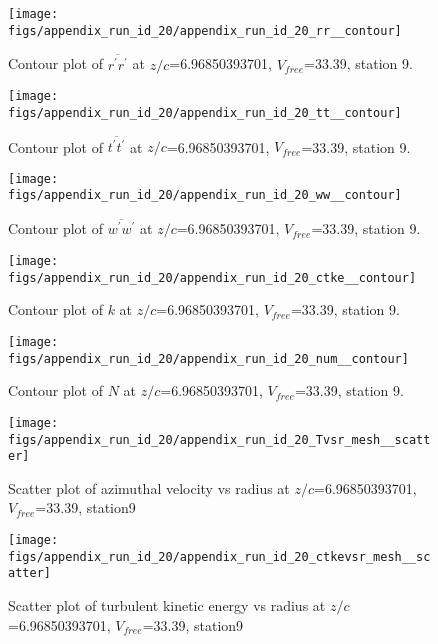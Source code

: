 \begin{figure}[H]
\centering
\texttt{[image: figs/appendix\_run\_id\_20/appendix\_run\_id\_20\_rr\_\_contour]}
\caption{Contour plot of $\overline{r^\prime r^\prime}$ at $z/c$=6.96850393701, $V_{free}$=33.39, station 9.}
\label{fig:appendix_run_id_20_rr__contour}
\end{figure}


\begin{figure}[H]
\centering
\texttt{[image: figs/appendix\_run\_id\_20/appendix\_run\_id\_20\_tt\_\_contour]}
\caption{Contour plot of $\overline{t^\prime t^\prime}$ at $z/c$=6.96850393701, $V_{free}$=33.39, station 9.}
\label{fig:appendix_run_id_20_tt__contour}
\end{figure}


\begin{figure}[H]
\centering
\texttt{[image: figs/appendix\_run\_id\_20/appendix\_run\_id\_20\_ww\_\_contour]}
\caption{Contour plot of $\overline{w^\prime w^\prime}$ at $z/c$=6.96850393701, $V_{free}$=33.39, station 9.}
\label{fig:appendix_run_id_20_ww__contour}
\end{figure}


\begin{figure}[H]
\centering
\texttt{[image: figs/appendix\_run\_id\_20/appendix\_run\_id\_20\_ctke\_\_contour]}
\caption{Contour plot of $k$ at $z/c$=6.96850393701, $V_{free}$=33.39, station 9.}
\label{fig:appendix_run_id_20_ctke__contour}
\end{figure}


\begin{figure}[H]
\centering
\texttt{[image: figs/appendix\_run\_id\_20/appendix\_run\_id\_20\_num\_\_contour]}
\caption{Contour plot of $N$ at $z/c$=6.96850393701, $V_{free}$=33.39, station 9.}
\label{fig:appendix_run_id_20_num__contour}
\end{figure}


\begin{figure}[H]
\centering
\texttt{[image: figs/appendix\_run\_id\_20/appendix\_run\_id\_20\_Tvsr\_mesh\_\_scatter]}
\caption{Scatter plot of azimuthal velocity vs radius at $z/c$=6.96850393701, $V_{free}$=33.39, station9}
\label{fig:appendix_run_id_20_Tvsr_mesh__scatter}
\end{figure}


\begin{figure}[H]
\centering
\texttt{[image: figs/appendix\_run\_id\_20/appendix\_run\_id\_20\_ctkevsr\_mesh\_\_scatter]}
\caption{Scatter plot of turbulent kinetic energy vs radius at $z/c$=6.96850393701, $V_{free}$=33.39, station9}
\label{fig:appendix_run_id_20_ctkevsr_mesh__scatter}
\end{figure}



